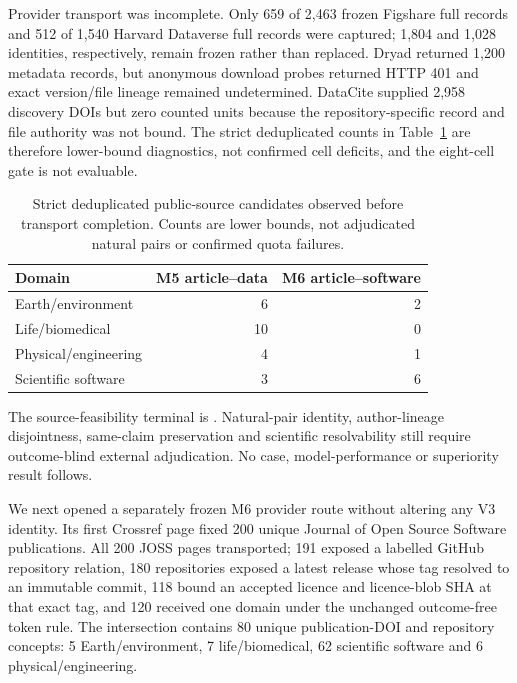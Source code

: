 Provider transport was incomplete. Only 659 of 2,463 frozen Figshare full
records and 512 of 1,540 Harvard Dataverse full records were captured; 1,804
and 1,028 identities, respectively, remain frozen rather than replaced. Dryad
returned 1,200 metadata records, but anonymous download probes returned HTTP
401 and exact version/file lineage remained undetermined. DataCite supplied
2,958 discovery DOIs but zero counted units because the repository-specific
record and file authority was not bound. The strict deduplicated counts in
Table~\ref{tab:p4-multiprovider-source-lower-bounds} are therefore lower-bound
diagnostics, not confirmed cell deficits, and the eight-cell gate is not
evaluable.

\begin{table}[t]
\centering
\small
\caption{Strict deduplicated public-source candidates observed before transport
completion. Counts are lower bounds, not adjudicated natural pairs or confirmed
quota failures.}
\label{tab:p4-multiprovider-source-lower-bounds}
\begin{tabular}{lrr}
\toprule
Domain & M5 article--data & M6 article--software \\
\midrule
Earth/environment & 6 & 2 \\
Life/biomedical & 10 & 0 \\
Physical/engineering & 4 & 1 \\
Scientific software & 3 & 6 \\
\bottomrule
\end{tabular}
\end{table}

The source-feasibility terminal is
. Natural-pair identity,
author-lineage disjointness, same-claim preservation and scientific
resolvability still require outcome-blind external adjudication. No case,
model-performance or superiority result follows.

We next opened a separately frozen M6 provider route without altering any V3
identity. Its first Crossref page fixed 200 unique Journal of Open Source
Software publications. All 200 JOSS pages transported; 191 exposed a labelled
GitHub repository relation, 180 repositories exposed a latest release whose tag
resolved to an immutable commit, 118 bound an accepted licence and licence-blob
SHA at that exact tag, and 120 received one domain under the unchanged
outcome-free token rule. The intersection contains 80 unique publication-DOI
and repository concepts: 5 Earth/environment, 7 life/biomedical, 62 scientific
software and 6 physical/engineering.


